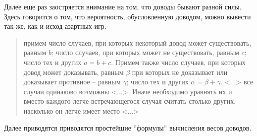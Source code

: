 \documentclass[12pt]{extarticle}
\begin{document}
Далее еще раз заостряется внимание на том, что доводы бывают разной силы.
Здесь говорится о том, что вероятность, обусловленную доводом, можно вывести так же, как и исход азартных игр.
\begin{quote}
примем число случаев, при которых некоторый довод может существовать, равным $b$; число случаев, при которых может не существовать, равным $c$; число тех и других $a=b+c$.
Примем также число случаев, при которых довод может доказывать, равным $\beta$ при которых не доказывает или доказывает противное -- равным $\gamma$; число тех и других $\alpha = \beta + \gamma$. 
<...> все случаи одинаково возможны <...>. Иначе необходимо уравнять их и вместо каждого легче встречающегося случая считать столько других, насколько он легче имеет место <...>
\end{quote}
Далее приводятся приводятся простейшие ''формулы'' вычисления весов доводов.
\end{document}

